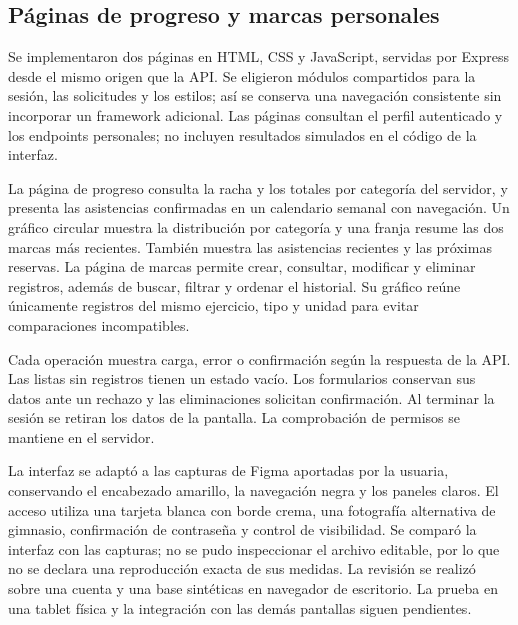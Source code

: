 \subsection{Páginas de progreso y marcas personales}
Se implementaron dos páginas en HTML, CSS y JavaScript, servidas por Express desde el mismo origen que la API. Se eligieron módulos compartidos para la sesión, las solicitudes y los estilos; así se conserva una navegación consistente sin incorporar un framework adicional. Las páginas consultan el perfil autenticado y los endpoints personales; no incluyen resultados simulados en el código de la interfaz.

La página de progreso consulta la racha y los totales por categoría del servidor, y presenta las asistencias confirmadas en un calendario semanal con navegación. Un gráfico circular muestra la distribución por categoría y una franja resume las dos marcas más recientes. También muestra las asistencias recientes y las próximas reservas. La página de marcas permite crear, consultar, modificar y eliminar registros, además de buscar, filtrar y ordenar el historial. Su gráfico reúne únicamente registros del mismo ejercicio, tipo y unidad para evitar comparaciones incompatibles.

Cada operación muestra carga, error o confirmación según la respuesta de la API. Las listas sin registros tienen un estado vacío. Los formularios conservan sus datos ante un rechazo y las eliminaciones solicitan confirmación. Al terminar la sesión se retiran los datos de la pantalla. La comprobación de permisos se mantiene en el servidor.

La interfaz se adaptó a las capturas de Figma aportadas por la usuaria, conservando el encabezado amarillo, la navegación negra y los paneles claros. El acceso utiliza una tarjeta blanca con borde crema, una fotografía alternativa de gimnasio, confirmación de contraseña y control de visibilidad. Se comparó la interfaz con las capturas; no se pudo inspeccionar el archivo editable, por lo que no se declara una reproducción exacta de sus medidas. La revisión se realizó sobre una cuenta y una base sintéticas en navegador de escritorio. La prueba en una tablet física y la integración con las demás pantallas siguen pendientes.
